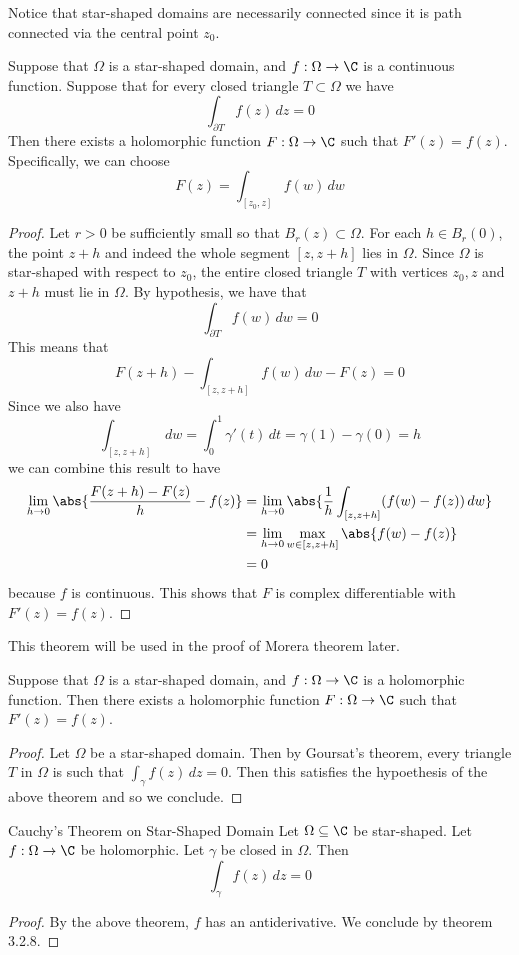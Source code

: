 \documentclass[a4paper]{article}
\begin{document}
Notice that star-shaped domains are necessarily connected since it is path connected via the central point $z_0$. 

\begin{thm}{}{} Suppose that $\Omega$ is a star-shaped domain, and $f:\Omega\to\C$ is a continuous function. Suppose that for every closed triangle $T\subset\Omega$ we have $$\int_{\partial T}f(z)\,dz=0$$ Then there exists a holomorphic function $F:\Omega\to\C$ such that $F'(z)=f(z)$. Specifically, we can choose $$F(z)=\int_{[z_0,z]}f(w)\,dw$$ 
\begin{proof}
Let $r>0$ be sufficiently small so that $B_r(z)\subset\Omega$. For each $h\in B_r(0)$, the point $z+h$ and indeed the whole segment $[z,z+h]$ lies in $\Omega$. Since $\Omega$ is star-shaped with respect to $z_0$, the entire closed triangle $T$ with vertices $z_0,z$ and $z+h$ must lie in $\Omega$. By hypothesis, we have that $$\int_{\partial T}f(w)\,dw=0$$ This means that $$F(z+h)-\int_{[z,z+h]}f(w)\,dw-F(z)=0$$ Since we also have $$\int_{[z,z+h]}\,dw=\int_0^1\gamma'(t)\,dt=\gamma(1)-\gamma(0)=h$$ we can combine this result to have 
\begin{align*}
\lim_{h\to 0}\abs{\frac{F(z+h)-F(z)}{h}-f(z)}&=\lim_{h\to 0}\abs{\frac{1}{h}\int_{[z,z+h]}(f(w)-f(z))\,dw}\\
&=\lim_{h\to 0}\max_{w\in[z,z+h]}\abs{f(w)-f(z)}\\
&=0
\end{align*}
because $f$ is continuous. This shows that $F$ is complex differentiable with $F'(z)=f(z)$. 
\end{proof}
\end{thm}

This theorem will be used in the proof of Morera theorem later. 

\begin{crl}{}{} Suppose that $\Omega$ is a star-shaped domain, and $f:\Omega\to\C$ is a holomorphic function. Then there exists a holomorphic function $F:\Omega\to\C$ such that $F'(z)=f(z)$. 
\begin{proof}
Let $\Omega$ be a star-shaped domain. Then by Goursat's theorem, every triangle $T$ in $\Omega$ is such that $\int_\gamma f(z)\,dz=0$. Then this satisfies the hypoethesis of the above theorem and so we conclude. 
\end{proof}
\end{crl}

\begin{thm}{Cauchy's Theorem on Star-Shaped Domain}{} Let $\Omega\subseteq\C$ be star-shaped. Let $f:\Omega\to\C$ be holomorphic. Let $\gamma$ be closed in $\Omega$. Then $$\int_{\gamma}f(z)\,dz=0$$ 
\begin{proof}
By the above theorem, $f$ has an antiderivative. We conclude by theorem 3.2.8. 
\end{proof}
\end{thm}
\end{document}
